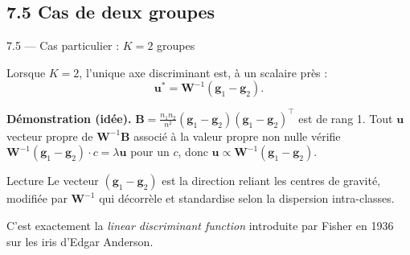 \subsection{7.5 Cas de deux groupes}
\begin{frame}{7.5 — Cas particulier : $K = 2$ groupes}
\begin{theorem}
Lorsque $K = 2$, l'unique axe discriminant est, à un scalaire près :
\[
\mathbf{u}^* = \mathbf{W}^{-1}(\mathbf{g}_1 - \mathbf{g}_2).
\]
\end{theorem}

\textbf{Démonstration (idée).}
$\mathbf{B} = \frac{n_1 n_2}{n^2}(\mathbf{g}_1 - \mathbf{g}_2)(\mathbf{g}_1 - \mathbf{g}_2)^\top$
est de rang 1. Tout $\mathbf{u}$ vecteur propre de $\mathbf{W}^{-1}\mathbf{B}$ associé à
la valeur propre non nulle vérifie
$\mathbf{W}^{-1}(\mathbf{g}_1 - \mathbf{g}_2) \cdot c = \lambda \mathbf{u}$ pour un $c$,
donc $\mathbf{u} \propto \mathbf{W}^{-1}(\mathbf{g}_1 - \mathbf{g}_2)$.

\begin{block}{Lecture}
\small Le vecteur $(\mathbf{g}_1 - \mathbf{g}_2)$ est la direction reliant
les centres de gravité, modifiée par $\mathbf{W}^{-1}$ qui décorrèle et standardise
selon la dispersion intra-classes.
\end{block}

\begin{rema}
\small C'est exactement la \emph{linear discriminant function} introduite par
Fisher en 1936 sur les iris d'Edgar Anderson.
\end{rema}
\end{frame}

